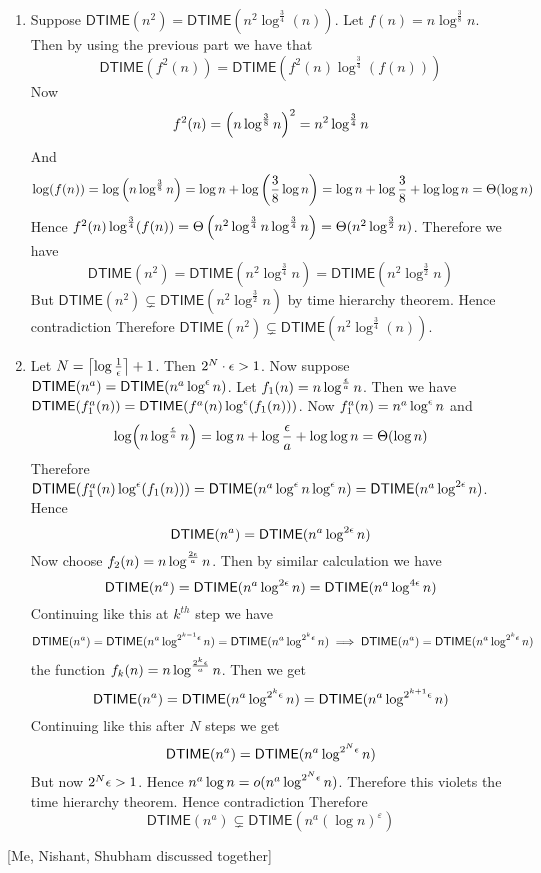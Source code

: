 \documentclass[a4paper, 11pt]{article}
\begin{document}
{\begin{enumerate}[label=(\alph*)]
Certainly $M''$ runs in $O(t_2(f(n)))$ time. Therefore $L''\in \textsf{DTIME}(t_2(f(n)))$. Hence $$	\textsf{DTIME}\left(t_1(f(n))\right)\subseteq \textsf{DTIME}\left(t_2(f(n))\right)$$ With similarly argument by switching $t_1$ and $t_2$ we can show $	\textsf{DTIME}\left(t_1(f(n))\right)\supseteq \textsf{DTIME}\left(t_2(f(n))\right)$. Therefore we have $	\textsf{DTIME}\left(t_1(f(n))\right)= \textsf{DTIME}\left(t_2(f(n))\right)$
\item Suppose $\textsf{DTIME}\left(n^2\right) = \textsf{DTIME}\left(n^2 \log ^{\frac34}(n)\right)$. Let $f(n)=n\log ^{\frac38}n$. Then by using the previous part we have that $$\textsf{DTIME}\left(f^2(n)\right) = \textsf{DTIME}\left(f^2(n) \log ^{\frac34}(f(n))\right)$$Now $$f^2(n)=\left(n\log^{\frac38}n\right)^2=n^2\log^{\frac34}n$$And $$\log (f(n))=\log \left(n\log^{\frac38}n\right)=\log n+\log \left(\frac38\log n\right)=\log n+\log\frac38+\log\log n=\Theta(\log n)$$Hence $f^2(n)\log^{\frac34}(f(n))=\Theta\left(n^2\log^{\frac34}n\log^{\frac34}n\right)=\Theta(n^2\log^{\frac32}n)$. Therefore we have $$\textsf{DTIME}(n^2)=\textsf{DTIME}(n^2\log^{\frac34}n)=\textsf{DTIME}(n^2\log^{\frac32}n)$$But $\textsf{DTIME}(n^2)\subsetneq \textsf{DTIME}(n^2\log^{\frac32}n)$ by time hierarchy theorem. Hence contradiction \ctr Therefore $\textsf{DTIME}\left(n^2\right) \subsetneq \textsf{DTIME}\left(n^2 \log ^{\frac34}(n)\right)$.
\item Let $N=\left\lceil \log \frac1{\epsilon}\right\rceil+1$. Then $2^N\cdot\epsilon>1$. Now suppose $\textsf{DTIME}(n^a)=\textsf{DTIME}(n^a\log^{\epsilon}n)$. Let $f_1(n)=n\log^{\frac{\epsilon}a}n$. Then we have $\textsf{DTIME}(f_1^a(n))=\textsf{DTIME}(f^a(n)\log^{\epsilon}(f_1(n)))$. Now $f_1^a(n)=n^a\log^{\epsilon}n$ and $$\log (n\log^{\frac{\epsilon}a}n)=\log n+\log\frac{\epsilon}a+\log\log n=\Theta(\log n)$$Therefore $\textsf{DTIME}(f_1^a(n)\log^{\epsilon}(f_1(n)))=\textsf{DTIME}(n^a\log^{\epsilon}n\log ^{\epsilon}n)=\textsf{DTIME}(n^a\log^{2\epsilon}n)$. Hence $$\textsf{DTIME}(n^a)=\textsf{DTIME}(n^a\log^{2\epsilon}n)$$Now choose $f_2(n)=n\log^{\frac{2\epsilon}a}n$. Then by similar calculation we have $$\textsf{DTIME}(n^a)=\textsf{DTIME}(n^a\log^{2\epsilon}n)=\textsf{DTIME}(n^a\log^{4\epsilon}n)$$Continuing like this at $k^{th}$ step we have $$\textsf{DTIME}(n^a)=\textsf{DTIME}(n^a\log^{2^{k-1}\epsilon}n)=\textsf{DTIME}(n^a\log^{2^k\epsilon}n)\implies \textsf{DTIME}(n^a)=\textsf{DTIME}(n^a\log^{2^k\epsilon}n)$$ the function $f_k(n)=n\log^{\frac{2^k\epsilon}a}n$. Then we get $$\textsf{DTIME}(n^a)=\textsf{DTIME}(n^a\log^{2^k\epsilon}n)=\textsf{DTIME}(n^a\log^{2^{k+1}\epsilon}n)$$Continuing like this after $N$ steps we get $$\textsf{DTIME}(n^a)=\textsf{DTIME}(n^a\log^{2^{N}\epsilon}n)$$But now $2^N\epsilon>1$. Hence $n^a\log n=o(n^a\log^{2^{N}\epsilon}n)$. Therefore this violets the time hierarchy theorem. Hence contradiction \ctr Therefore $$
\textsf{DTIME}\left(n^a\right) \subsetneq \textsf{DTIME}\left(n^a(\log n)^{\varepsilon}\right)
$$
\end{enumerate}
}\parinf

[Me, Nishant, Shubham discussed together]
\parinn
\end{document}
